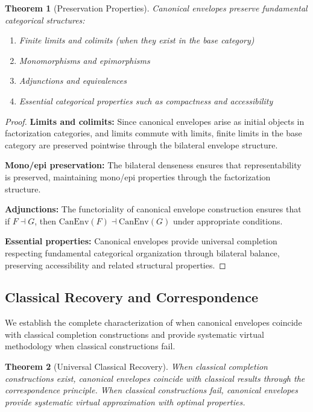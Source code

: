 \documentclass[11pt]{article}
\theoremstyle{plain}
\newtheorem{theorem}{Theorem}[section]
\theoremstyle{definition}
\theoremstyle{remark}
\begin{document}
\begin{theorem}[Preservation Properties]
Canonical envelopes preserve fundamental categorical structures:
\begin{enumerate}
\item Finite limits and colimits (when they exist in the base category)
\item Monomorphisms and epimorphisms  
\item Adjunctions and equivalences
\item Essential categorical properties such as compactness and accessibility
\end{enumerate}
\end{theorem}

\begin{proof}
\textbf{Limits and colimits:} Since canonical envelopes arise as initial objects in factorization categories, and limits commute with limits, finite limits in the base category are preserved pointwise through the bilateral envelope structure.

\textbf{Mono/epi preservation:} The bilateral denseness ensures that representability is preserved, maintaining mono/epi properties through the factorization structure.

\textbf{Adjunctions:} The functoriality of canonical envelope construction ensures that if $F \dashv G$, then $\mathrm{CanEnv}(F) \dashv \mathrm{CanEnv}(G)$ under appropriate conditions.

\textbf{Essential properties:} Canonical envelopes provide universal completion respecting fundamental categorical organization through bilateral balance, preserving accessibility and related structural properties.
\end{proof}

\subsection{Classical Recovery and Correspondence}

We establish the complete characterization of when canonical envelopes coincide with classical completion constructions and provide systematic virtual methodology when classical constructions fail.

\begin{theorem}[Universal Classical Recovery]
When classical completion constructions exist, canonical envelopes coincide with classical results through the correspondence principle. When classical constructions fail, canonical envelopes provide systematic virtual approximation with optimal properties.
\end{theorem}
\end{document}
